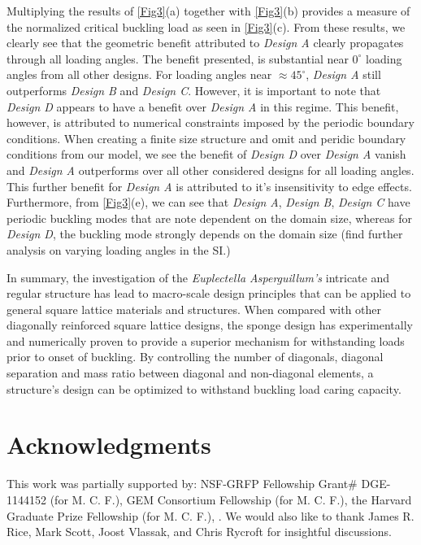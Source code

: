\documentclass[9pt,twocolumn,twoside]{fernandes_paper}
\newcommand{\mf}[1]{\noindent\color{orange}{$\Longrightarrow$#1}\normalcolor}
\begin{document}
Multiplying the results of \cref{Fig3}(a) together with \cref{Fig3}(b) provides a measure of the normalized critical buckling load as seen in \cref{Fig3}(c). From these results, we clearly see that the geometric benefit attributed to \emph{Design A} clearly propagates through all loading angles. The benefit presented, is substantial near $0^\circ$ loading angles from all other designs. For loading angles near $\approx 45 ^\circ$, \emph{Design A} still outperforms \emph{Design B} and \emph{Design C}. However, it is important to note that \emph{Design D} appears to have a benefit over \emph{Design A} in this regime. This benefit, however, is attributed to numerical constraints imposed by the periodic boundary conditions. When creating a finite size structure and omit and peridic boundary conditions from our model, we see the benefit of \emph{Design D} over \emph{Design A} vanish and \emph{Design A} outperforms over all other considered designs for all loading angles. This further benefit for \emph{Design A} is attributed to it's insensitivity to edge effects. Furthermore, from \cref{Fig3}(e), we can see that \emph{Design A}, \emph{Design B}, \emph{Design C} have periodic buckling modes that are note dependent on the domain size, whereas for \emph{Design D}, the buckling mode strongly depends on the domain size (find further analysis on varying loading angles in the SI.)

\mf{write section on Optimization here}

In summary, the investigation of the \textit{Euplectella Asperguillum's} intricate and regular structure has lead to macro-scale design principles that can be applied to general square lattice materials and structures. When compared with other diagonally reinforced square lattice designs, the sponge design has experimentally and numerically proven to provide a superior mechanism for withstanding loads prior to onset of buckling. By controlling the number of diagonals, diagonal separation and mass ratio between diagonal and non-diagonal elements, a structure's design can be optimized to withstand buckling load caring capacity. 

\section*{Acknowledgments}
 \noindent This work was partially supported by: NSF-GRFP Fellowship  Grant\# DGE-1144152 (for M. C. F.), GEM Consortium Fellowship (for M. C. F.), the Harvard Graduate Prize Fellowship (for M. C. F.), \mf{add whatever else here}.
 We would also like to thank James R. Rice, Mark Scott, Joost Vlassak, and Chris Rycroft for insightful discussions.
\end{document}

